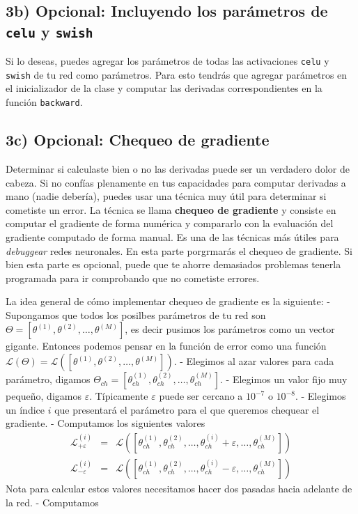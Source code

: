 \documentclass[11pt]{article}
\begin{document}
    \hypertarget{b-opcional-incluyendo-los-paruxe1metros-de-celu-y-swish}{%
\subsection{\texorpdfstring{3b) Opcional: Incluyendo los parámetros de
\texttt{celu} y
\texttt{swish}}{3b) Opcional: Incluyendo los parámetros de celu y swish}}\label{b-opcional-incluyendo-los-paruxe1metros-de-celu-y-swish}}

Si lo deseas, puedes agregar los parámetros de todas las activaciones
\texttt{celu} y \texttt{swish} de tu red como parámetros. Para esto
tendrás que agregar parámetros en el inicializador de la clase y
computar las derivadas correspondientes en la función \texttt{backward}.

    \hypertarget{c-opcional-chequeo-de-gradiente}{%
\subsection{3c) Opcional: Chequeo de
gradiente}\label{c-opcional-chequeo-de-gradiente}}

Determinar si calculaste bien o no las derivadas puede ser un verdadero
dolor de cabeza. Si no confías plenamente en tus capacidades para
computar derivadas a mano (nadie debería), puedes usar una técnica muy
útil para determinar si cometiste un error. La técnica se llama
\textbf{chequeo de gradiente} y consiste en computar el gradiente de
forma numérica y compararlo con la evaluación del gradiente computado de
forma manual. Es una de las técnicas más útiles para \emph{debuggear}
redes neuronales. En esta parte porgrmarás el chequeo de gradiente. Si
bien esta parte es opcional, puede que te ahorre demasiados problemas
tenerla programada para ir comprobando que no cometiste errores.

La idea general de cómo implementar chequeo de gradiente es la
siguiente: - Supongamos que todos los posilbes parámetros de tu red son
\(\Theta=[\theta^{(1)},\theta^{(2)},\ldots, \theta^{(M)}]\), es decir
pusimos los parámetros como un vector gigante. Entonces podemos pensar
en la función de error como una función
\(\mathcal{L}(\Theta)=\mathcal{L}([\theta^{(1)},\theta^{(2)},\ldots, \theta^{(M)}])\).
- Elegimos al azar valores para cada parámetro, digamos
\(\Theta_{ch}=[\theta_{ch}^{(1)},\theta_{ch}^{(2)},\ldots, \theta_{ch}^{(M)}]\).
- Elegimos un valor fijo muy pequeño, digamos \(\varepsilon\).
Típicamente \(\varepsilon\) puede ser cercano a \(10^{-7}\) o
\(10^{-8}\). - Elegimos un índice \(i\) que presentará el parámetro para
el que queremos chequear el gradiente. - Computamos los siguientes
valores \begin{eqnarray}
\mathcal{L}^{(i)}_{+\varepsilon} & = & 
\mathcal{L}([\theta_{ch}^{(1)},\theta_{ch}^{(2)},\ldots,\theta_{ch}^{(i)}+\varepsilon,\ldots,\theta_{ch}^{(M)}]) \\
\mathcal{L}^{(i)}_{-\varepsilon} & = & 
\mathcal{L}([\theta_{ch}^{(1)},\theta_{ch}^{(2)},\ldots,\theta_{ch}^{(i)}-\varepsilon,\ldots,\theta_{ch}^{(M)}])
\end{eqnarray} Nota para calcular estos valores necesitamos hacer dos
pasadas hacia adelante de la red. - Computamos
\end{document}
